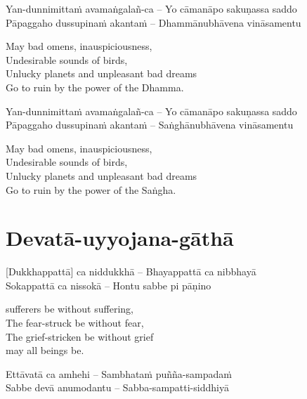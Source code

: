 Yan-dunnimittaṁ avamaṅgalañ-ca – Yo cāmanāpo sakuṇassa saddo\\
Pāpaggaho dussupinaṁ akantaṁ – Dhammānubhāvena vināsamentu

\begin{english-verses}
  May bad omens, inauspiciousness,\\
  Undesirable sounds of birds,\\
  Unlucky planets and unpleasant bad dreams\\
  Go to ruin by the power of the Dhamma.
\end{english-verses}

Yan-dunnimittaṁ avamaṅgalañ-ca – Yo cāmanāpo sakuṇassa saddo\\
Pāpaggaho dussupinaṁ akantaṁ – Saṅghānubhāvena vināsamentu

\begin{english-verses}
  May bad omens, inauspiciousness,\\
  Undesirable sounds of birds,\\
  Unlucky planets and unpleasant bad dreams\\
  Go to ruin by the power of the Saṅgha.
\end{english-verses}

\suttaRef{[Trad]}

\section{Devatā-uyyojana-gāthā}
\label{devata-uyyojana-gatha}

\vspace{-1em}

[Dukkhappattā] ca niddukkhā – Bhayappattā ca nibbhayā\\
Sokappattā ca nissokā – Hontu sabbe pi pāṇino

\begin{english-verses}
  [May] sufferers be without suffering,\\
  The fear-struck be without fear,\\
  The grief-stricken be without grief\\\relax
  [Thus] may all beings be.
\end{english-verses}

Ettāvatā ca amhehi – Sambhataṁ puñña-sampadaṁ\\
Sabbe devā anumodantu\hyperlink{endnote125-appendix}{\hypertarget{endnote125-body}{}}
– Sabba-sampatti-siddhiyā


